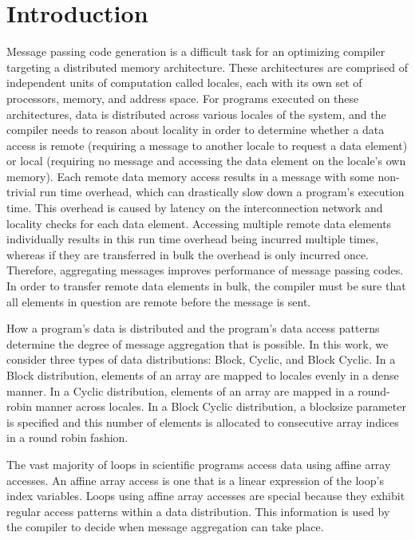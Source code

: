 \section{Introduction}\label{sec:intro} 

Message passing code generation is a difficult task for an optimizing compiler targeting a distributed memory architecture. These architectures are comprised of independent units of computation called locales, each with its own set of processors, memory, and address space. For programs executed on these architectures, data is distributed across various locales of the system, and the compiler needs to reason about locality in order to determine whether a data access is remote (requiring a message to another locale to request a data element) or local (requiring no message and accessing the data element on the locale's own memory). Each remote data memory access results in a message with some non-trivial run time overhead, which can drastically slow down a program's execution time. This overhead is caused by latency on the interconnection network and locality checks for each data element. Accessing multiple remote data elements individually results in this run time overhead being incurred multiple times, whereas if they are transferred in bulk the overhead is only incurred once. Therefore, aggregating messages improves performance of message passing codes. In order to transfer remote data elements in bulk, the compiler must be sure that all elements in question are remote before the message is sent. 

How a program's data is distributed and the program's data access patterns determine the degree of message aggregation that is possible. In this work, we consider three types of data distributions: Block, Cyclic, and Block Cyclic. In a Block distribution, elements of an array are mapped to locales evenly in a dense manner. In a Cyclic distribution, elements of an array are mapped in a round-robin manner across locales. In a Block Cyclic distribution, a blocksize parameter is specified and this number of elements is allocated to consecutive array indices in a round robin fashion. 

The vast majority of loops in scientific programs access data using affine array accesses. An affine array access is one that is a linear expression of the loop's index variables. Loops using affine array accesses are special because they exhibit regular access patterns within a data distribution. This information is used by the compiler to decide when message aggregation can take place. 

